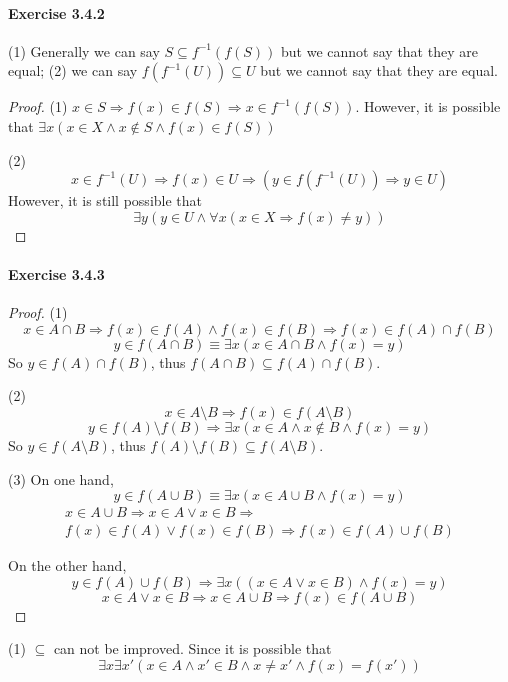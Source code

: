 \paragraph{Exercise 3.4.2} \label{exercise3.4.2}
(1) Generally we can say $S \subseteq f^{-1}(f(S))$ but we cannot say that they are equal; (2) we can 
say $f(f^{-1}(U)) \subseteq U$ but we cannot say that they are equal.
\begin{proof}
(1) $x \in S \Longrightarrow f(x) \in f(S) \Longrightarrow x \in f^{-1}(f(S))$. However, it is possible 
that $\exists x(x \in X \wedge x \notin S \wedge f(x) \in f(S))$

(2) 
\[
x \in f^{-1}(U) \Longrightarrow f(x) \in U \Longrightarrow (y \in f(f^{-1}(U)) \Longrightarrow y \in U)
\]
However, it is still possible that 
\[
\exists y(y \in U \wedge \forall x(x \in X \Longrightarrow f(x) \neq y))
\]
\end{proof}

\paragraph{Exercise 3.4.3} \label{exercise3.4.3}
\begin{proof}
(1)
\[
x \in A \cap B \Longrightarrow f(x) \in f(A) \wedge f(x) \in f(B) \Longrightarrow 
f(x) \in f(A) \cap f(B)
\]
\[
y \in f(A \cap B) \equiv \exists x(x \in A \cap B \wedge f(x) = y)
\]
So $y \in f(A) \cap f(B)$, thus $f(A \cap B) \subseteq f(A) \cap f(B)$.

(2)
\[
x \in A \setminus B \Longrightarrow f(x) \in f(A\setminus B)
\]
\[
y \in f(A)\setminus f(B) \Longrightarrow \exists x(x \in A \wedge x \notin B \wedge f(x) = y)
\]
So $y \in f(A\setminus B)$, thus $f(A)\setminus f(B) \subseteq f(A\setminus B)$.

(3)
On one hand, 
\[
y \in f(A \cup B) \equiv \exists x (x \in A \cup B \wedge f(x) = y)
\]
\begin{align*}
x \in A \cup B \Longrightarrow x \in A \vee x \in B \Longrightarrow \\
f(x) \in f(A) \vee f(x) \in f(B) \Longrightarrow f(x) \in f(A)\cup f(B)
\end{align*}

On the other hand, 
\[
y \in f(A) \cup f(B) \Longrightarrow \exists x((x \in A \vee x \in B) \wedge f(x) = y) 
\]
\[
x \in A \vee x \in B \Longrightarrow x \in A \cup B \Longrightarrow f(x) \in f(A\cup B)
\]
\end{proof}

(1) $\subseteq$ can not be improved. Since it is possible that 
\[
\exists x \exists x'(x \in A \wedge x' \in B \wedge x \neq x' \wedge f(x) = f(x'))
\]

